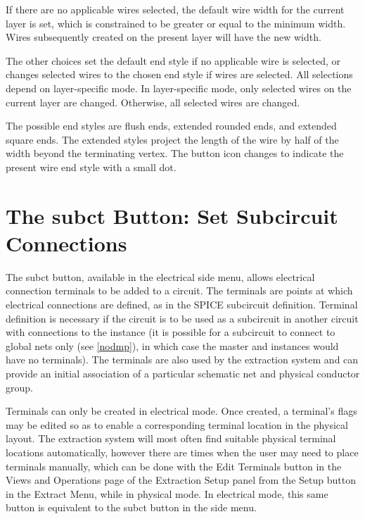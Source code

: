If there are no applicable wires selected, the default wire width for
the current layer is set, which is constrained to be greater or equal
to the minimum width.  Wires subsequently created on the present layer
will have the new width.

The other choices set the default end style if no applicable wire is
selected, or changes selected wires to the chosen end style if wires
are selected.  All selections depend on layer-specific mode.  In
layer-specific mode, only selected wires on the current layer are
changed.  Otherwise, all selected wires are changed.

The possible end styles are flush ends, extended rounded ends, and
extended square ends.  The extended styles project the length of the
wire by half of the width beyond the terminating vertex.  The button
icon changes to indicate the present wire end style with a small dot.


\section{The {\cb subct} Button: Set Subcircuit Connections}
\label{subct}

The {\cb subct} button, available in the electrical side menu, allows
electrical connection terminals to be added to a circuit.  The
terminals are points at which electrical connections are defined, as
in the SPICE subcircuit definition.  Terminal definition is necessary
if the circuit is to be used as a subcircuit in another circuit with
connections to the instance (it is possible for a subcircuit to
connect to global nets only (see \ref{nodmp}), in which case the
master and instances would have no terminals).  The terminals are also
used by the extraction system and can provide an initial association
of a particular schematic net and physical conductor group. 

Terminals can only be created in electrical mode.  Once created, a
terminal's flags may be edited so as to enable a corresponding
terminal location in the physical layout.  The extraction system will
most often find suitable physical terminal locations automatically,
however there are times when the user may need to place terminals
manually, which can be done with the {\cb Edit Terminals} button in
the {\cb Views and Operations} page of the {\cb Extraction Setup}
panel from the {\cb Setup} button in the {\cb Extract Menu}, while in
physical mode.  In electrical mode, this same button is equivalent to
the {\cb subct} button in the side menu.

